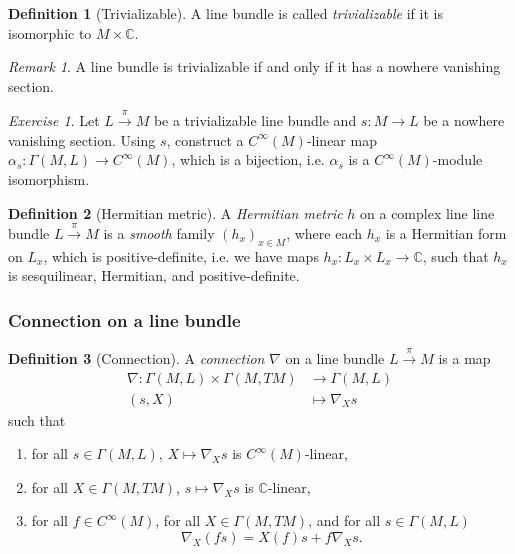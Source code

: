 \documentclass[12pt]{amsart}
\numberwithin{equation}{section}
\theoremstyle{plain}
\theoremstyle{definition}
\newtheorem{defn}{Definition}[subsection]
\theoremstyle{remark}
\newtheorem{rem}{Remark}[subsection]
\newtheorem{exe}{Exercise}[subsection]
\begin{document}
\begin{defn}[Trivializable]
A line bundle is called \emph{trivializable} if it is isomorphic to $M\times\mathbb{C}$.
\end{defn}

\begin{rem}
A line bundle is trivializable if and only if it has a nowhere vanishing section.
\end{rem}

\begin{exe}
Let $L\xrightarrow{\pi}M$ be a trivializable line bundle and $s\colon M\to L$ be a nowhere vanishing section. Using $s$, construct a $C^\infty(M)$-linear map $\alpha_s\colon \Gamma(M,L)\to C^\infty(M)$, which is a bijection, i.e. $\alpha_s$ is a $C^\infty(M)$-module isomorphism.
\end{exe}

\begin{defn}[Hermitian metric]
A \emph{Hermitian metric} $h$ on a complex line line bundle $L\xrightarrow{\pi}M$ is a \emph{smooth} family $(h_x)_{x\in M}$, where each $h_x$ is a Hermitian form on $L_x$, which is positive-definite, i.e. we have maps $h_x\colon L_x\times L_x\to \mathbb{C}$, such that $h_x$ is sesquilinear, Hermitian, and positive-definite.
\end{defn}


\subsubsection{Connection on a line bundle}



\begin{defn}[Connection]
A \emph{connection} $\nabla$ on a line bundle $L\xrightarrow{\pi}M$ is a map 
\begin{align*}
\nabla\colon \Gamma(M,L)\times \Gamma(M,TM)&\to \Gamma(M,L)\\
(s,X)&\mapsto \nabla_Xs
\end{align*}
such that
\begin{enumerate}[$(i)$]
\item{for all $s\in \Gamma(M,L)$, $X\mapsto \nabla_Xs$ is $C^\infty(M)$-linear,}
\item{for all $X\in \Gamma(M,TM)$, $s\mapsto \nabla_Xs$ is $\mathbb{C}$-linear,}
\item{for all $f\in C^\infty(M)$, for all $X\in\Gamma(M,TM)$, and for all $s\in\Gamma(M,L)$
$$\nabla_X(fs)=X(f)s+f\nabla_Xs.$$
}
\end{enumerate}
\end{defn}
\end{document}

